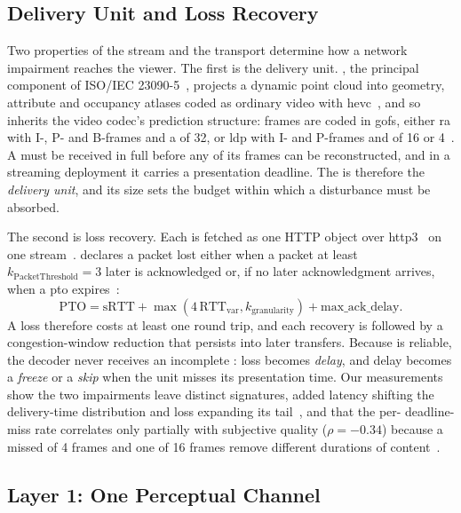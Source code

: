 \subsection{Delivery Unit and Loss Recovery}
\label{sec:model-unit}
Two properties of the stream and the transport determine how a network
impairment reaches the viewer. The first is the delivery unit. \vpcc,
the principal component of ISO/IEC 23090-5~\cite{v3c,vpccgraziosi},
projects a dynamic point cloud into geometry, attribute and occupancy
atlases coded as ordinary video with \gls{hevc}~\cite{hevc,tmc2}, and so
inherits the video codec's prediction structure: frames are coded in
\glspl{gof}, either \gls{ra} with I-, P- and B-frames and a \gof of 32,
or \gls{ldp} with I- and P-frames and \gofs of 16 or
4~\cite{vpccctc,hmctc}. A \gof must be received in full before any of
its frames can be reconstructed, and in a streaming deployment it
carries a presentation deadline. The \gof is therefore the
\emph{delivery unit}, and its size sets the budget within which a
disturbance must be absorbed.

The second is loss recovery. Each \gof is fetched as one HTTP object
over \gls{http3}~\cite{rfc9114} on one \quic stream~\cite{rfc9000}.
\quic declares a packet lost either when a packet at least
$k_{\mathrm{PacketThreshold}}=3$ later is acknowledged or, if no later
acknowledgment arrives, when a \gls{pto} expires~\cite{rfc9002}:
\begin{equation}
  \mathrm{PTO} = \mathrm{sRTT} + \max(4\,\mathrm{RTT}_{\mathrm{var}},
  k_{\mathrm{granularity}}) + \mathrm{max\_ack\_delay}.
  \label{eq:pto}
\end{equation}
A loss therefore costs at least one round trip, and each recovery is
followed by a congestion-window reduction that persists into later
transfers. Because \quic is reliable, the decoder never receives an
incomplete \gof: loss becomes \emph{delay}, and delay becomes a
\emph{freeze} or a \emph{skip} when the unit misses its presentation
time. Our measurements show the two impairments leave distinct
signatures, added latency shifting the delivery-time distribution and
loss expanding its tail~\cite{vquest2026}, and that the per-\gof
deadline-miss rate correlates only partially with subjective quality
($\rho = -0.34$) because a missed \gof of 4 frames and one of 16
frames remove different durations of content~\cite{mosaic2026}.

\subsection{Layer 1: One Perceptual Channel}
\label{sec:model-layer1}

